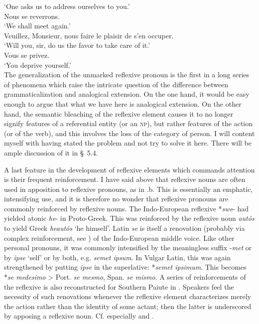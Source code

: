 \glt ‘One asks us to address ourselves to you.’\\
\ex Nous se reverrons.\\
\glt ‘We shall meet again.’\\
\ex Veuillez, Monsieur, nous faire le plaisir de s'en occuper.\\
\glt ‘Will you, sir, do us the favor to take care of it.’\\
\ex Vous se privez.\\
\glt ‘You deprive yourself.’\\
\z
\z
\noindent The generalization of the unmarked reflexive pronoun is the first in a long series of phenomena which raise the intricate question of the difference between grammaticalization and analogical extension. On the one hand, it would be easy enough to argue that what we have here is analogical extension. On the other hand, the semantic bleaching of the reflexive element causes it to no longer signify features of a referential entity (or an \textsc{np}), but rather features of the action (or of the verb), and this involves the loss of the category of person. I will content myself with having stated the problem and not try to solve it here. There will be ample discussion of it in §~5.4.

A last feature in the development of reflexive elements which commands attention is their frequent reinforcement. I have said above that reflexive nouns are often used in apposition to reflexive pronouns, as in .b. This is essentially an emphatic, intensifying use, and it is therefore no wonder that reflexive pronouns are commonly reinforced by reflexive nouns. The Indo-European reflexive *\textit{swe}{}- had yielded atonic \textit{he}{}- in Proto-Greek. This was reinforced by the reflexive noun \textit{autós} to yield Greek \textit{heautós} ‘he himself’. Latin \textit{se} is itself a renovation (probably via complex reinforcement, see ) of the Indo-European middle voice. Like other personal pronouns, it was commonly intensified by the meaningless suffix -\textit{met} or by \textit{ipse} ‘self’ or by both, e.g. \textit{semet ipsum}. In Vulgar Latin, this was again strengthened by putting \textit{ipse} in the superlative: *\textit{semet ipsimum}. This becomes *\textit{se medesimo} {\textgreater} Port. \textit{se mesmo}, Span. \textit{se mismo}. A series of reinforcements of the reflexive is also reconstructed for Southern Paiute in \citet[107]{Langacker1977}. Speakers feel the necessity of such renovations whenever the reflexive element characterizes merely the action rather than the identity of some actant; then the latter is underscored by apposing a reflexive noun. Cf. especially \citealt[238--244]{Faltz1977} and \citealt[329--334]{Strunk1980}.

